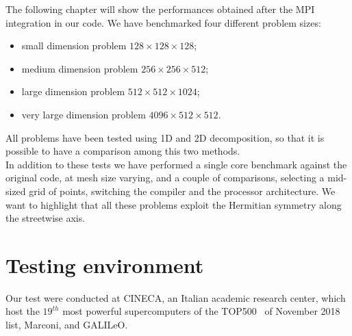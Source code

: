 The following chapter will show the performances obtained after the MPI integration in our code.
We have benchmarked four different problem sizes:
\begin{itemize}
\item small dimension problem $128\times 128 \times 128$;
\item medium dimension problem $256\times 256\times 512$;
\item large dimension problem $512\times 512\times 1024$;
\item very large dimension problem $4096\times 512\times 512$.  
\end{itemize}
All problems have been tested using 1D and 2D decomposition, so that it is possible to have a comparison among this two methods.
\\
In addition to these tests we have performed a single core benchmark against the original code, at mesh size varying, and a couple of comparisons, selecting a mid-sized grid of points, switching the compiler and the processor architecture.
We want to highlight that all these problems exploit the Hermitian symmetry along the streetwise axis.
\section{Testing environment}
Our test were conducted at CINECA\cite{Cineca}, an Italian academic research center, which host the $19^{th}$ most powerful supercomputers of the TOP500~\cite{top500} of November 2018 list, Marconi, and GALILeO.

